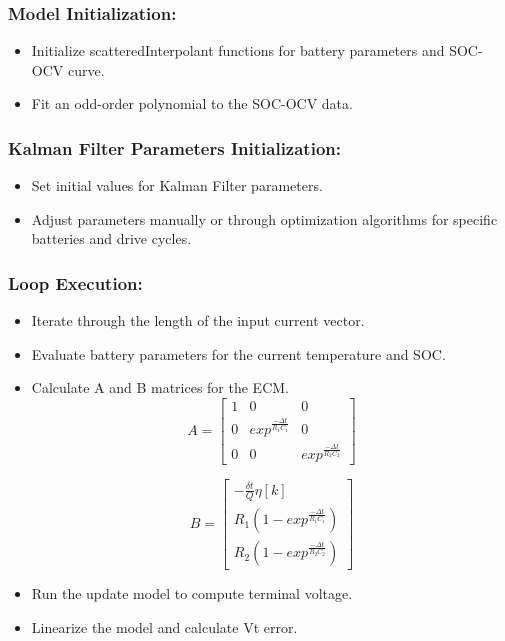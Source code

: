 \documentclass[conference]{IEEEtran}
\begin{document}
\subsubsection{Model Initialization:}
\begin{itemize}
  \item Initialize scatteredInterpolant functions for battery parameters and SOC-OCV curve.
  \item Fit an odd-order polynomial to the SOC-OCV data.
\end{itemize}

\subsubsection{Kalman Filter Parameters Initialization:}
\begin{itemize}
  \item Set initial values for Kalman Filter parameters.
  \item Adjust parameters manually or through optimization algorithms for specific batteries and drive cycles.
\end{itemize}

\subsubsection{Loop Execution:}
\begin{itemize}
  \item Iterate through the length of the input current vector.
  \item Evaluate battery parameters for the current temperature and SOC.
  \item Calculate A and B matrices for the ECM.
  \[ A = 
\begin{bmatrix}
    1 & 0 & 0 \\
    0 & exp^{\frac{-\Delta t}{R_1C_1}} & 0 \\
    0 & 0 & exp^{\frac{-\Delta t}{R_2C_2}}
\end{bmatrix}
\]

\[ B = 
\begin{bmatrix}
    -\frac{\delta t}{Q}\eta[k]\\
    R_1(1-exp^{\frac{-\Delta t}{R_1C_1}}) \\
    R_2(1-exp^{\frac{-\Delta t}{R_2C_2}})
\end{bmatrix}
\]
  \item Run the update model to compute terminal voltage.
  \item Linearize the model and calculate Vt error.
\end{itemize}
\end{document}
